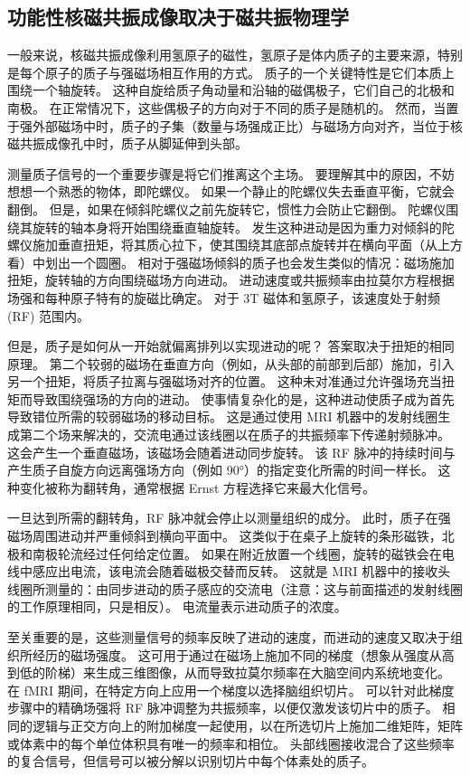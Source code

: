 \subsection{功能性核磁共振成像取决于磁共振物理学}

一般来说，核磁共振成像利用氢原子的磁性，氢原子是体内质子的主要来源，特别是每个原子的质子与强磁场相互作用的方式。
质子的一个关键特性是它们本质上围绕一个轴旋转。
这种自旋给质子角动量和沿轴的磁偶极子，它们自己的北极和南极。
在正常情况下，这些偶极子的方向对于不同的质子是随机的。
然而，当置于强外部磁场中时，质子的子集（数量与场强成正比）与磁场方向对齐，当位于核磁共振成像孔中时，质子从脚延伸到头部。


测量质子信号的一个重要步骤是将它们推离这个主场。 
要理解其中的原因，不妨想想一个熟悉的物体，即陀螺仪。 
如果一个静止的陀螺仪失去垂直平衡，它就会翻倒。 
但是，如果在倾斜陀螺仪之前先旋转它，惯性力会防止它翻倒。 
陀螺仪围绕其旋转的轴本身将开始围绕垂直轴旋转。 
发生这种进动是因为重力对倾斜的陀螺仪施加垂直扭矩，将其质心拉下，使其围绕其底部点旋转并在横向平面（从上方看）中划出一个圆圈。 
相对于强磁场倾斜的质子也会发生类似的情况：磁场施加扭矩，旋转轴的方向围绕磁场方向进动。 
进动速度或共振频率由拉莫尔方程根据场强和每种原子特有的旋磁比确定。 
对于 3T 磁体和氢原子，该速度处于射频 (RF) 范围内。


但是，质子是如何从一开始就偏离排列以实现进动的呢？ 
答案取决于扭矩的相同原理。 
第二个较弱的磁场在垂直方向（例如，从头部的前部到后部）施加，引入另一个扭矩，将质子拉离与强磁场对齐的位置。 
这种未对准通过允许强场充当扭矩而导致围绕强场的方向的进动。 
使事情复杂化的是，这种进动使质子成为首先导致错位所需的较弱磁场的移动目标。
这是通过使用 MRI 机器中的发射线圈生成第二个场来解决的，交流电通过该线圈以在质子的共振频率下传递射频脉冲。 
这会产生一个垂直磁场，该磁场会随着进动同步旋转。 
该 RF 脉冲的持续时间与产生质子自旋方向远离强场方向（例如 90°）的指定变化所需的时间一样长。 
这种变化被称为翻转角，通常根据 Ernst 方程选择它来最大化信号。


一旦达到所需的翻转角，RF 脉冲就会停止以测量组织的成分。 
此时，质子在强磁场周围进动并严重倾斜到横向平面中。 
这类似于在桌子上旋转的条形磁铁，北极和南极轮流经过任何给定位置。 
如果在附近放置一个线圈，旋转的磁铁会在电线中感应出电流，该电流会随着磁极交替而反转。 
这就是 MRI 机器中的接收头线圈所测量的：由同步进动的质子感应的交流电（注意：这与前面描述的发射线圈的工作原理相同，只是相反）。 
电流量表示进动质子的浓度。


至关重要的是，这些测量信号的频率反映了进动的速度，而进动的速度又取决于组织所经历的磁场强度。 
这可用于通过在磁场上施加不同的梯度（想象从强度从高到低的阶梯）来生成三维图像，从而导致拉莫尔频率在大脑空间内系统地变化。 
在 fMRI 期间，在特定方向上应用一个梯度以选择脑组织切片。 
可以针对此梯度步骤中的精确场强将 RF 脉冲调整为共振频率，以便仅激发该切片中的质子。 
相同的逻辑与正交方向上的附加梯度一起使用，以在所选切片上施加二维矩阵，矩阵或体素中的每个单位体积具有唯一的频率和相位。 
头部线圈接收混合了这些频率的复合信号，但信号可以被分解以识别切片中每个体素处的质子。



